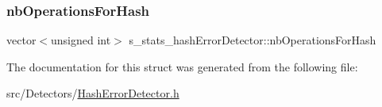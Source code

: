 \subsubsection{\texorpdfstring{nb\+Operations\+For\+Hash}{nbOperationsForHash}}
{\footnotesize\ttfamily vector$<$unsigned int$>$ s\+\_\+stats\+\_\+hash\+Error\+Detector\+::nb\+Operations\+For\+Hash}



The documentation for this struct was generated from the following file\+:\begin{DoxyCompactItemize}
\item 
src/\+Detectors/\hyperlink{_hash_error_detector_8h}{Hash\+Error\+Detector.\+h}\end{DoxyCompactItemize}
